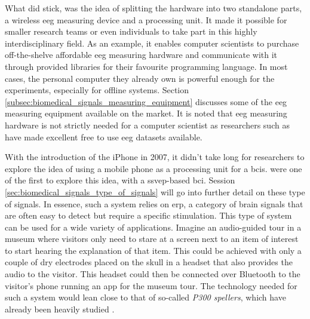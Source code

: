 What did stick, was the idea of splitting the hardware into two standalone parts, a wireless \gls{eeg} measuring device and a processing unit.
It made it possible for smaller research teams or even individuals to take part in this highly interdisciplinary field.
As an example, it enables computer scientists to purchase off-the-shelve affordable \gls{eeg} measuring hardware and communicate with it through provided libraries for their favourite programming language.
In most cases, the personal computer they already own is powerful enough for the experiments, especially for offline systems.
Section \ref{subsec:biomedical_signals_measuring_equipment} discusses some of the \gls{eeg} measuring equipment available on the market.
It is noted that \gls{eeg} measuring hardware is not strictly needed for a computer scientist as researchers such as \citet{eeg_data} have made excellent free to use \gls{eeg} datasets available.

With the introduction of the iPhone in 2007, it didn't take long for researchers to explore the idea of using a mobile phone as a processing unit for a \glspl{bci}.
\citet{early_bci_phone} were one of the first to explore this idea, with a \gls{ssvep}-based \gls{bci}.
Session \ref{sec:biomedical_signals_type_of_signals} will go into further detail on these type of signals.
In essence, such a system relies on \gls{erp}, a category of brain signals that are often easy to detect but require a specific stimulation.
This type of system can be used for a wide variety of applications.
Imagine an audio-guided tour in a museum where visitors only need to stare at a screen next to an item of interest to start hearing the explanation of that item.
This could be achieved with only a couple of dry electrodes placed on the skull in a headset that also provides the audio to the visitor.
This headset could then be connected over Bluetooth to the visitor's phone running an app for the museum tour.
The technology needed for such a system would lean close to that of so-called \textit{P300 spellers}, which have already been heavily studied \citep{p300_spellers_review, p300_keyboard_flashing, p300_spellers}.

